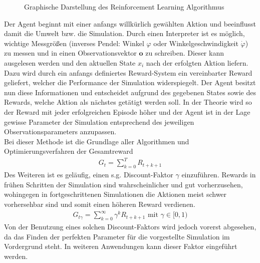 	\begin{figure}[H] %
		\centering
		\def\svgwidth{12cm}
		
		\caption{Graphische Darstellung des Reinforcement Learning Algorithmus}
		\label{fig:rl_chart}
	\end{figure}
	Der Agent beginnt mit einer anfangs willkürlich gewählten Aktion und beeinflusst damit die Umwelt bzw. die Simulation. Durch einen Interpreter ist es möglich, wichtige Messgrößen (inverses Pendel: Winkel $\varphi$ oder Winkelgeschwindigkeit $\dot{\varphi}$) zu messen und in einen Observationsvektor $\textbf{o}$ zu schreiben. Dieser kann ausgelesen werden und den aktuellen State $x_i$ nach der erfolgten Aktion liefern. Dazu wird durch ein anfangs definiertes Reward-System ein vereinbarter Reward geliefert, welcher die Performance der Simulation widerspiegelt. Der Agent besitzt nun diese Informationen und entscheidet aufgrund des gegebenen States sowie des Rewards, welche Aktion als nächstes getätigt werden soll. In der Theorie wird so der Reward mit jeder erfolgreichen Episode höher und der Agent ist in der Lage gewisse Parameter der Simulation entsprechend des jeweiligen Observationsparameters anzupassen.\\
	Bei dieser Methode ist die Grundlage aller Algorithmen und Optimierungsverfahren der Gesamtreward
	\begin{align}
		G_t = \sum_{k=0}^{T}R_{t+k+1}
	\end{align}
	Des Weiteren ist es geläufig, einen s.g. \glqq Discount-Faktor\grqq{} $\gamma$ einzuführen. Rewards in frühen Schritten der Simulation sind wahrscheinlicher und gut vorherzusehen, wohingegen in fortgeschrittenen Simulationen die Aktionen meist schwer vorhersehbar sind und somit einen höheren Reward verdienen.
	\begin{align}
		G_{t\gamma} = \sum_{k=0}^{\infty}\gamma^k R_{t+k+1}\text{ mit }\gamma\in[0,1)
	\end{align}
	Von der Benutzung eines solchen Discount-Faktors wird jedoch vorerst abgesehen, da das Finden der perfekten Parameter für die vorgestellte Simulation im Vordergrund steht. In weiteren Anwendungen kann dieser Faktor eingeführt werden.
	

